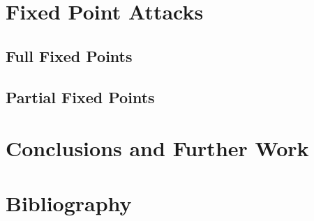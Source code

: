 \documentclass[10pt,twocolumn,twoside]{pnas-new}
\begin{document}

\section{Fixed Point Attacks} \label{sec:fixed}


\subsection{Full Fixed Points} \label{sec:f:full}


\subsection{Partial Fixed Points} \label{sec:f:partial}



\section{Conclusions and Further Work} \label{sec:conclusion}


\section{Bibliography} \label{sec:bibliography}


\end{document}

